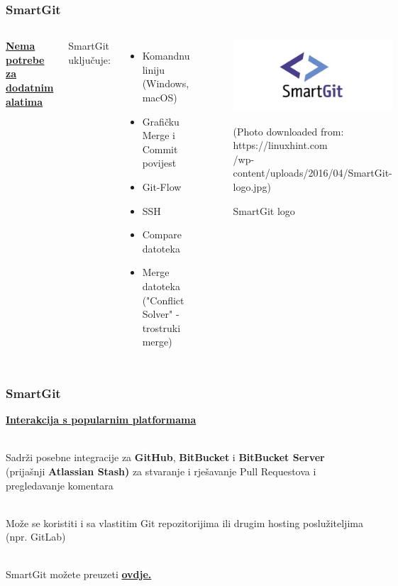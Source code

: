 \documentclass[hyperref={bookmarks=false},aspectratio=169]{beamer}
\begin{document}
\begin{frame}
\frametitle{SmartGit}
\begin{columns}

\textbf{\underline{Nema potrebe za dodatnim alatima\\}}\\\

SmartGit uključuje:

\begin{itemize}
   \item Komandnu liniju (Windows, macOS)
   \item Grafičku Merge i Commit povijest
   \item Git-Flow
   \item SSH
   \item Compare datoteka
   \item Merge datoteka ("Conflict Solver" - trostruki merge)
\end{itemize}


\begin{figure}
    \centering
    \includegraphics[width=\columnwidth]{./figures/SmartGit-logo.jpg}
    \caption{SmartGit logo}
    \tiny{(Photo downloaded from: https://linuxhint.com\\/wp-content/uploads/2016/04/SmartGit-logo.jpg)}
    \label{fig:smartgit-logo}
\end{figure}

\end{columns}

\end{frame}

\begin{frame}
\frametitle{SmartGit}
\textbf{\underline{Interakcija s popularnim platformama}}\\\

Sadrži posebne integracije za \textbf{GitHub}, \textbf{BitBucket} i \textbf{BitBucket Server} (prijašnji \textbf{Atlassian Stash)} za stvaranje i rješavanje Pull Requestova i pregledavanje komentara\\\

Može se koristiti i sa vlastitim Git repozitorijima ili drugim hosting poslužiteljima (npr. GitLab)\\\

SmartGit možete preuzeti \textbf{\href{https://www.syntevo.com/smartgit/}{ovdje.}}


\end{frame}
\end{document}
